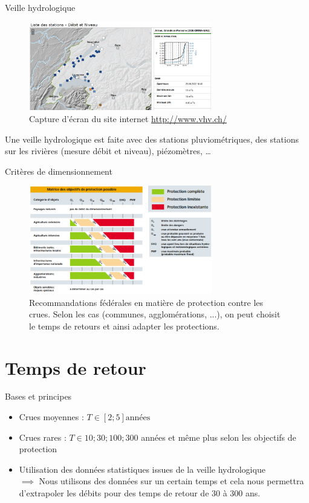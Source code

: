 \documentclass{beamer}
\begin{document}
\begin{frame}{Veille hydrologique}
    \begin{figure}
        \centering
        \includegraphics[width=8cm]{veilleHydrologique_VAUD.png}
        \caption{Capture d'écran du site internet \href{http://www.vhv.ch/}{http://www.vhv.ch/}}
    \end{figure}
    Une veille hydrologique est faite avec des stations pluviométriques, des stations sur les rivières (mesure débit et niveau), piézomètres, \dots
\end{frame}

\begin{frame}{Critères de dimensionnement}
    \begin{figure}
        \centering
        \includegraphics[width=8cm]{matriceObjectifsDimensionnement.png}
        \caption{Recommandations fédérales en matière de protection contre les crues. Selon les cas (communes, agglomérations, ...), on peut choisit le temps de retours et ainsi adapter les protections.}
    \end{figure}

\end{frame}

\section{Temps de retour}
\begin{frame}{Bases et principes}
    \begin{itemize}[label=$\rhd$]
        \item Crues moyennes : $T \in [2;5] \mathrm{années}$
        \item Crues rares : $T \in {10;30;100;300}$ années et même plus selon les objectifs de protection
        \item Utilisation des données statistiques issues de la veille hydrologique \\
        $\implies$ Nous utilisons des données sur un certain temps et cela nous permettra d'extrapoler les débits pour des temps de retour de 30 à 300 ans.
    \end{itemize}
\end{frame}
\end{document}
